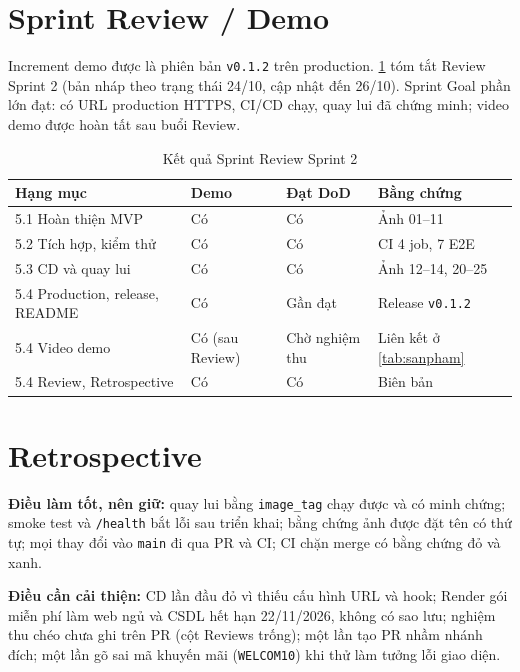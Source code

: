 \section{Sprint Review / Demo}\label{sec:se-review}
Increment demo được là phiên bản \texttt{v0.1.2} trên production. \cref{tab:review} tóm tắt Review Sprint 2 (bản nháp theo trạng thái 24/10, cập nhật đến 26/10). Sprint Goal phần lớn đạt: có URL production HTTPS, CI/CD chạy, quay lui đã chứng minh; video demo được hoàn tất sau buổi Review.
\begin{table}[htbp]\centering
\caption{Kết quả Sprint Review Sprint 2}\label{tab:review}
\begin{tabular}{@{}p{4.4cm}p{1.8cm}p{2cm}p{4.6cm}@{}}\toprule
\textbf{Hạng mục} & \textbf{Demo} & \textbf{Đạt DoD} & \textbf{Bằng chứng} \\ \midrule
5.1 Hoàn thiện MVP & Có & Có & Ảnh 01--11 \\
5.2 Tích hợp, kiểm thử & Có & Có & CI 4 job, 7 E2E \\
5.3 CD và quay lui & Có & Có & Ảnh 12--14, 20--25 \\
5.4 Production, release, README & Có & Gần đạt & Release \texttt{v0.1.2} \\
5.4 Video demo & Có (sau Review) & Chờ nghiệm thu & Liên kết ở \cref{tab:sanpham} \\
5.4 Review, Retrospective & Có & Có & Biên bản \\ \bottomrule
\end{tabular}
\end{table}

\section{Retrospective}\label{sec:se-retro}
\textbf{Điều làm tốt, nên giữ:} quay lui bằng \texttt{image\_tag} chạy được và có minh chứng; smoke test và \texttt{/health} bắt lỗi sau triển khai; bằng chứng ảnh được đặt tên có thứ tự; mọi thay đổi vào \texttt{main} đi qua PR và CI; CI chặn merge có bằng chứng đỏ và xanh.

\textbf{Điều cần cải thiện:} CD lần đầu đỏ vì thiếu cấu hình URL và hook; Render gói miễn phí làm web ngủ và CSDL hết hạn 22/11/2026, không có sao lưu; nghiệm thu chéo chưa ghi trên PR (cột Reviews trống); một lần tạo PR nhầm nhánh đích; một lần gõ sai mã khuyến mãi (\texttt{WELCOM10}) khi thử làm tưởng lỗi giao diện.

